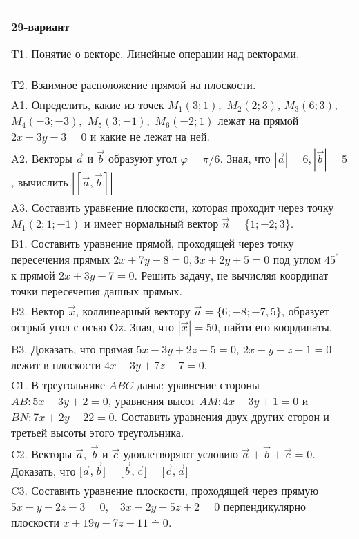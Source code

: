 \documentclass{article}
\begin{document}
\begin{tabular}{m{17cm}}
\textbf{29-вариант}
\newline

T1. 
Понятие о векторе. Линейные операции над векторами.
 \\
T2. 
Взаимное расположение прямой на плоскости.
 \\
A1. 
Определить, какие из точек \(M_{1}(3;1),\) \(M_{2}(2;3)\), \(M_{3}(6;3),\) \(M_{4}( - 3; - 3),\) \(M_{5}(3; - 1),\) \(M_{6}( - 2;1)\) лежат на прямой \(2x - 3y - 3 = 0\) и какие не лежат на ней.
 \\
A2. 
Векторы \(\overrightarrow{a}\) и \(\overrightarrow{b}\) образуют угол \(\varphi = \pi/6\). Зная, что \(|\overrightarrow{a}| = 6,|\overrightarrow{b}| = 5\), вычислить \(\left| \left\lbrack \overrightarrow{a},\overrightarrow{b} \right\rbrack \right|\)
 \\
A3. Составить уравнение плоскости, которая проходит через точку \(M_{1}(2;1; - 1)\) и имеет нормальный вектор \(\overrightarrow{n} = \{ 1; - 2;3\}\).
 \\
B1. 
Составить уравнение прямой, проходящей через точку пересечения прямых \(2x + 7y - 8 = 0,3x + 2y + 5 = 0\) под углом \(45^{{^\circ}}\) к прямой \(2x + 3y - 7 = 0\). Решить задачу, не вычисляя координат точки пересечения данных прямых.
 \\
B2. 
Вектор \(\overrightarrow{x}\), коллинеарный вектору \(\overrightarrow{a} = \{ 6; - 8; - 7,5\}\), образует острый угол с осью Oz. Зная, что \(|\overrightarrow{x}| = 50\), найти его координаты.
 \\
B3. 
Доказать, что прямая \(5x - 3y + 2z - 5 = 0\), \(2x - y - z - 1 = 0\) лежит в плоскости \(4x - 3y + 7z - 7 = 0\).
 \\
C1. 
В треугольнике \(ABC\) даны: уравнение стороны \(AB:5x - 3y + 2 = 0\), уравнения высот \(AM:4x - 3y + 1 = 0\) и \(BN:7x + 2y - 22 = 0\). Составить уравнения двух других сторон и третьей высоты этого треугольника.
 \\
C2. 
Векторы \(\overrightarrow{a},\ \overrightarrow{b}\) и \(\overrightarrow{c}\) удовлетворяют условию \(\overrightarrow{a} + \overrightarrow{b} + \overrightarrow{c} = 0\). Доказать, что \(\lbrack\overrightarrow{a},\overrightarrow{b}\rbrack = \lbrack\overrightarrow{b},\overrightarrow{c}\rbrack = \lbrack\overrightarrow{c},\overrightarrow{a}\rbrack\)
 \\
C3. 
Составить уравнение плоскости, проходящей через прямую \(5x - y - 2z - 3 = 0,\ \ \ \ 3x - 2y - 5z + 2 = 0\) перпендикулярно плоскости \(x + 19y - 7z - 11 \doteq 0\).
 \\

\end{tabular}
\vspace{1cm}
\end{document}
